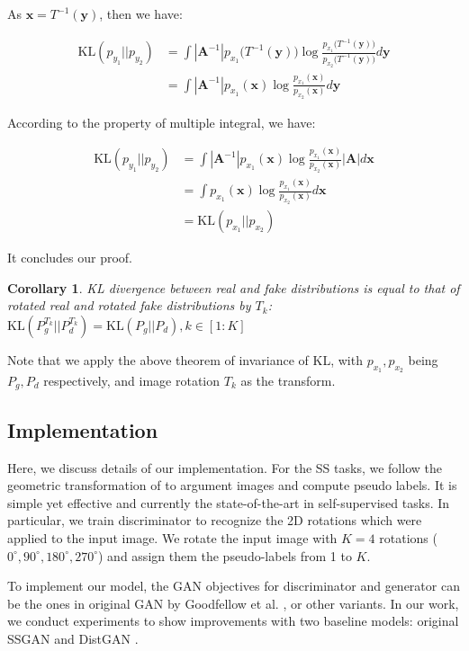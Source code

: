 \documentclass{article}
\newtheorem{corollary}{Corollary}
\begin{document}
As $\mathbf{x}=T^{-1}(\mathbf{y})$, then we have:

\begin{align}
\mathrm{KL}(p_{y_1}||p_{y_2})
&=\int|\boldsymbol{A}^{-1}| p_{x_1}\Big(T^{-1}(\mathbf{y})\Big)\log\frac{p_{x_1}\Big(T^{-1}(\mathbf{y})\Big)}{p_{x_2}\Big(T^{-1}(\mathbf{y})\Big)}d\mathbf{y}\\
&=\int|\boldsymbol{A}^{-1}| p_{x_1}(\mathbf{x})\log\frac{p_{x_1}(\mathbf{x})}{p_{x_2}(\mathbf{x})}d\mathbf{y}
\end{align}

According to the property of multiple integral, we have:

\begin{align}
\mathrm{KL}(p_{y_1}||p_{y_2})
&=\int|\boldsymbol{A}^{-1}| p_{x_1}(\mathbf{x})\log\frac{p_{x_1}(\mathbf{x})}{p_{x_2}(\mathbf{x})}|\boldsymbol{A}|d\mathbf{x}\\
&=\int p_{x_1}(\mathbf{x})\log\frac{p_{x_1}(\mathbf{x})}{p_{x_2}(\mathbf{x})}d\mathbf{x}\\
&=\mathrm{KL}(p_{x_1}||p_{x_2})
\end{align}

It concludes our proof.

\begin{corollary}
KL divergence between real and fake distributions is equal to that of rotated real and rotated fake distributions by $T_k$: $\mathrm{KL}(P_g^{T_k}||P_d^{T_k}) = \mathrm{KL}(P_g||P_d), k \in [1 : K]$
\end{corollary}


Note that we apply the above theorem of invariance of KL, with $p_{x_1},p_{x_2}$ being $P_g, P_d$ respectively, and image rotation $T_k$ as the transform.

\subsection{Implementation}

Here, we discuss  details of our implementation. For the SS tasks, we follow the geometric transformation of \cite{gidaris-iclr-2018} to argument images and compute pseudo labels. It is simple yet effective and currently the state-of-the-art in self-supervised tasks. In particular, we train discriminator to recognize the 2D rotations which were applied to the input image. We rotate the input image with $K = 4$ rotations ($0^{\circ}, 90^{\circ}, 180^{\circ}, 270^{\circ}$) and assign them the pseudo-labels from 1 to $K$.

To implement our model, the GAN objectives for discriminator and generator can be the ones in original  GAN by Goodfellow et al. \cite{goodfellow-nisp-2014}, or other variants. In our work, we conduct experiments to show improvements with two baseline models: original SSGAN \cite{chen-arxiv-2018} and DistGAN \cite{tran-eccv-2018}.
\end{document}
